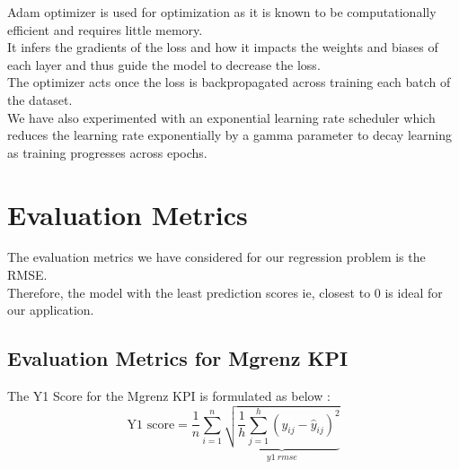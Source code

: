 \documentclass{report} %
\begin{document}
Adam optimizer is used for optimization as it is known to be computationally efficient and requires little memory. \cite{ADAM-2017} \\
It infers the gradients of the loss and how it impacts the weights and biases of each layer and thus guide the model to decrease the loss. \\
The optimizer acts once the loss is backpropagated across training each batch of the dataset.\\
We have also experimented with an exponential learning rate scheduler which reduces the learning rate exponentially by a gamma parameter to decay learning as training progresses across epochs.

\section{Evaluation Metrics}

The evaluation metrics we have considered for our regression problem is the \ac{RMSE}. \\
Therefore, the model with the least prediction scores ie, closest to 0 is ideal for our application. \\

\subsection{Evaluation Metrics for Mgrenz \ac{KPI}}\label{sec:Evaluation Metrics for 2D KPI}

The Y1 Score for the Mgrenz \ac{KPI} is formulated as below :
\begin{equation}
\text{Y1 score} = \frac{1}{n} \sum_{i=1}^{n} \underbrace{ \sqrt{\frac{1}{h} \sum_{j=1}^{h} (y_{ij} - \hat{y}_{ij})^2}}_{y1\ rmse}
\label{eq:Y1 Score}
\end{equation}

\end{document}

